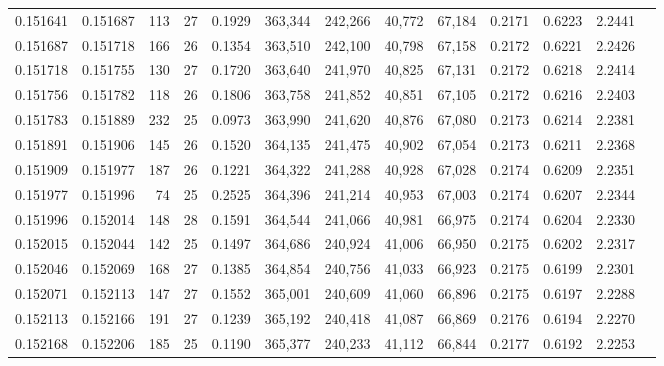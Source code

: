 \begin{tabular}{rrrrrrrrrrrrr}
0.151641 & 0.151687 & 113 &  27 &                                     0.1929 & 363,344 & 242,266 &  40,772 &  67,184 & 0.2171 & 0.6223 & 2.2441 \\
0.151687 & 0.151718 & 166 &  26 &                                     0.1354 & 363,510 & 242,100 &  40,798 &  67,158 & 0.2172 & 0.6221 & 2.2426 \\
0.151718 & 0.151755 & 130 &  27 &                                     0.1720 & 363,640 & 241,970 &  40,825 &  67,131 & 0.2172 & 0.6218 & 2.2414 \\
0.151756 & 0.151782 & 118 &  26 &                                     0.1806 & 363,758 & 241,852 &  40,851 &  67,105 & 0.2172 & 0.6216 & 2.2403 \\
0.151783 & 0.151889 & 232 &  25 &                                     0.0973 & 363,990 & 241,620 &  40,876 &  67,080 & 0.2173 & 0.6214 & 2.2381 \\
0.151891 & 0.151906 & 145 &  26 &                                     0.1520 & 364,135 & 241,475 &  40,902 &  67,054 & 0.2173 & 0.6211 & 2.2368 \\
0.151909 & 0.151977 & 187 &  26 &                                     0.1221 & 364,322 & 241,288 &  40,928 &  67,028 & 0.2174 & 0.6209 & 2.2351 \\
0.151977 & 0.151996 &  74 &  25 &                                     0.2525 & 364,396 & 241,214 &  40,953 &  67,003 & 0.2174 & 0.6207 & 2.2344 \\
0.151996 & 0.152014 & 148 &  28 &                                     0.1591 & 364,544 & 241,066 &  40,981 &  66,975 & 0.2174 & 0.6204 & 2.2330 \\
0.152015 & 0.152044 & 142 &  25 &                                     0.1497 & 364,686 & 240,924 &  41,006 &  66,950 & 0.2175 & 0.6202 & 2.2317 \\
0.152046 & 0.152069 & 168 &  27 &                                     0.1385 & 364,854 & 240,756 &  41,033 &  66,923 & 0.2175 & 0.6199 & 2.2301 \\
0.152071 & 0.152113 & 147 &  27 &                                     0.1552 & 365,001 & 240,609 &  41,060 &  66,896 & 0.2175 & 0.6197 & 2.2288 \\
0.152113 & 0.152166 & 191 &  27 &                                     0.1239 & 365,192 & 240,418 &  41,087 &  66,869 & 0.2176 & 0.6194 & 2.2270 \\
0.152168 & 0.152206 & 185 &  25 &                                     0.1190 & 365,377 & 240,233 &  41,112 &  66,844 & 0.2177 & 0.6192 & 2.2253 \\

\end{tabular}
